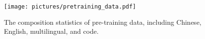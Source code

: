 
\begin{figure}[tb]
\vskip 0.1in
\begin{center}
\centerline{\texttt{[image: pictures/pretraining\_data.pdf]}}
\caption{The composition statistics of pre-training data, including Chinese, English, multilingual, and code.}
\label{pre-training_data}
\end{center}
\vskip -0.3in
\end{figure}